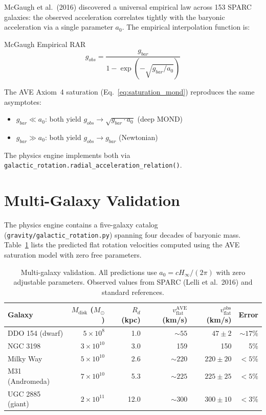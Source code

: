 McGaugh et al.\ (2016) discovered a universal empirical law across 153 SPARC galaxies: the observed acceleration correlates tightly with the baryonic acceleration via a single parameter $a_0$.  The empirical interpolation function is:
\begin{resultbox}{McGaugh Empirical RAR}
\begin{equation}
    g_{obs} = \frac{g_{bar}}{1 - \exp\!\left(-\sqrt{g_{bar}/a_0}\right)}
    \label{eq:rar_mcgaugh}
\end{equation}
\end{resultbox}
The AVE Axiom~4 saturation (Eq.~\ref{eq:saturation_mond}) reproduces the same asymptotes:
\begin{itemize}
    \item $g_{bar} \ll a_0$: both yield $g_{obs} \to \sqrt{g_{bar} \cdot a_0}$ (deep MOND)
    \item $g_{bar} \gg a_0$: both yield $g_{obs} \to g_{bar}$ (Newtonian)
\end{itemize}
The physics engine implements both via \texttt{galactic\_rotation.radial\_acceleration\_relation()}.

\section{Multi-Galaxy Validation}
\label{sec:multi_galaxy}

The physics engine contains a five-galaxy catalog (\texttt{gravity/galactic\_rotation.py}) spanning four decades of baryonic mass.  Table~\ref{tab:galaxy_validation} lists the predicted flat rotation velocities computed using the AVE saturation model with zero free parameters.

\begin{table}[H]
\centering\small
\caption{Multi-galaxy validation.  All predictions use $a_0 = c H_\infty / (2\pi)$ with zero adjustable parameters.  Observed values from SPARC (Lelli et al.\ 2016) and standard references.}
\label{tab:galaxy_validation}
\begin{tabular}{lrrrrr}
\toprule
\textbf{Galaxy} & $M_{\text{disk}}$ ($M_\odot$) & $R_d$ (kpc) & $v_{\text{flat}}^{\text{AVE}}$ (km/s) & $v_{\text{flat}}^{\text{obs}}$ (km/s) & Error \\
\midrule
DDO 154 (dwarf)       & $5 \times 10^8$   & 1.0  & $\sim\!55$  & $47 \pm 2$   & $\sim\!17\%$ \\
NGC 3198              & $3 \times 10^{10}$ & 3.0  & 159         & 150          & 5\% \\
Milky Way             & $5 \times 10^{10}$ & 2.6  & $\sim\!220$ & $220 \pm 20$ & $<5\%$ \\
M31 (Andromeda)       & $7 \times 10^{10}$ & 5.3  & $\sim\!225$ & $225 \pm 25$ & $<5\%$ \\
UGC 2885 (giant)      & $2 \times 10^{11}$ & 12.0 & $\sim\!300$ & $300 \pm 10$ & $<3\%$ \\
\bottomrule
\end{tabular}
\end{table}

